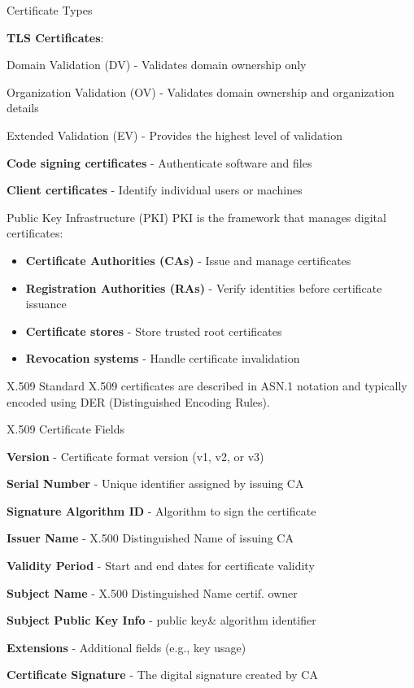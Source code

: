 \begin{definition}{Certificate Types}

    \textbf{TLS Certificates}:

     Domain Validation (DV) - Validates domain ownership only

        Organization Validation (OV) - Validates domain ownership and organization details

        Extended Validation (EV) - Provides the highest level of validation

\textbf{Code signing certificates} - Authenticate software and files

\textbf{Client certificates} - Identify individual users or machines
\end{definition}

\begin{concept}{Public Key Infrastructure (PKI)}
PKI is the framework that manages digital certificates:
\begin{itemize}
    \item \textbf{Certificate Authorities (CAs)} - Issue and manage certificates
    \item \textbf{Registration Authorities (RAs)} - Verify identities before certificate issuance
    \item \textbf{Certificate stores} - Store trusted root certificates
    \item \textbf{Revocation systems} - Handle certificate invalidation
\end{itemize}
\end{concept}

\begin{definition}{X.509 Standard}
X.509 certificates are described in ASN.1 notation and typically encoded using DER (Distinguished Encoding Rules).
\end{definition}

\begin{concept}{X.509 Certificate Fields}

\textbf{Version} - Certificate format version (v1, v2, or v3)

\textbf{Serial Number} - Unique identifier assigned by issuing CA

\textbf{Signature Algorithm ID} - Algorithm to sign the certificate

\textbf{Issuer Name} - X.500 Distinguished Name of issuing CA

\textbf{Validity Period} - Start and end dates for certificate validity

\textbf{Subject Name} - X.500 Distinguished Name certif. owner

\textbf{Subject Public Key Info} - public key\& algorithm identifier

\textbf{Extensions} - Additional fields (e.g., key usage)

\textbf{Certificate Signature} - The digital signature created by CA

\end{concept}


